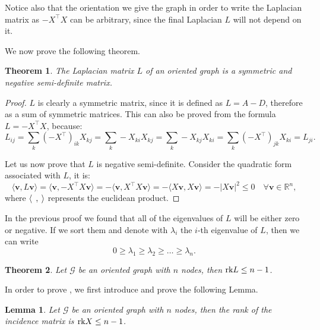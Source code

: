 \documentclass[12pt,a4paper]{report}
\newtheorem{theorem}{Theorem}[chapter] %
\newtheorem{lemma}{Lemma}[chapter]
\theoremstyle{definition}
\begin{document}
Notice also that the orientation we give the graph in order to write the Laplacian matrix as $-X^\top X$ can be arbitrary, since the final Laplacian $L$ will not depend on it.

We now prove the following theorem.
\begin{theorem}
The Laplacian matrix $L$ of an oriented graph is a symmetric and negative semi-definite matrix.
\label{the:L_simm_negative}
\end{theorem}
\begin{proof}
$L$ is clearly a symmetric matrix, since it is defined as $L = A - D$, therefore as a sum of symmetric matrices. This can also be proved from the formula $L = -X^\top X$, because:
\begin{equation*}
    L_{ij} = \sum_k \left( -X^\top \right)_{ik} X_{kj} = \sum_k -X_{ki} X_{kj} = 
    \sum_k - X_{kj} X_{ki} = \sum_k \left( -X^\top \right)_{jk} X_{ki} = L_{ji} .
\end{equation*}

Let us now prove that $L$ is negative semi-definite.
Consider the quadratic form associated with $L$, it is:
\begin{equation*}
    \langle \mathbf{v}, L \mathbf{v} \rangle = 
    \langle \mathbf{v}, - X^\top X \mathbf{v} \rangle = 
    - \langle \mathbf{v}, X^\top X \mathbf{v} \rangle = 
    - \langle X \mathbf{v}, X \mathbf{v} \rangle  = 
    - |X \mathbf{v}|^2 \leq 0 \quad \forall \mathbf{v} \in \mathbb{R}^n ,
\end{equation*}
where $\langle \hspace{1ex} , \hspace{0.5ex} \rangle$ represents the euclidean product.
\end{proof}
In the previous proof we found that all of the eigenvalues of $L$ will be either zero or negative.
If we sort them and denote with $\lambda_i$ the $i$-th eigenvalue of $L$, then we can write
\begin{equation*}
    0 \geq \lambda_1 \geq \lambda_2 \geq \ldots \geq \lambda_n .
\end{equation*}

\begin{theorem}
\label{the:L_zero}
Let $\mathcal{G}$ be an oriented graph with $n$ nodes, then $\textup{rk} L \leq n - 1$.
\end{theorem}
In order to prove , we first introduce and prove the following Lemma.

\begin{lemma}
Let $\mathcal{G}$ be an oriented graph with $n$ nodes, then the rank of the incidence matrix is $\textup{rk} X \leq n - 1$.
\end{lemma}
\end{document}

